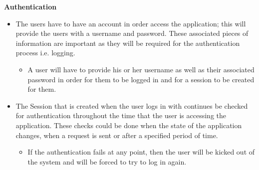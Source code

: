 \documentclass[10pt,a4paper]{article}
\begin{document}
\indent\textbf{Authentication}
                \begin{itemize}
                        \item The users have to have an account in order access the application; this will provide the users with a username and password. These associated pieces of information are important as they will be required for the authentication process i.e. logging.
                        \begin{itemize}
                                \item A user will have to provide his or her username as well as their associated password in order for them to be logged in and for a session to be created for them.
                        \end{itemize}
                \end{itemize}
                \begin{itemize}
                        \item The Session that is created when the user logs in with continues be checked for authentication throughout the time that the user is accessing the application. These checks could be done when the state of the application changes, when a request is sent or after a specified period of time.
                        \begin{itemize}
                                \item If the authentication fails at any point, then the user will be kicked out of the system and will be forced to try to log in again.
                        \end{itemize}
                \end{itemize}
\end{document}

